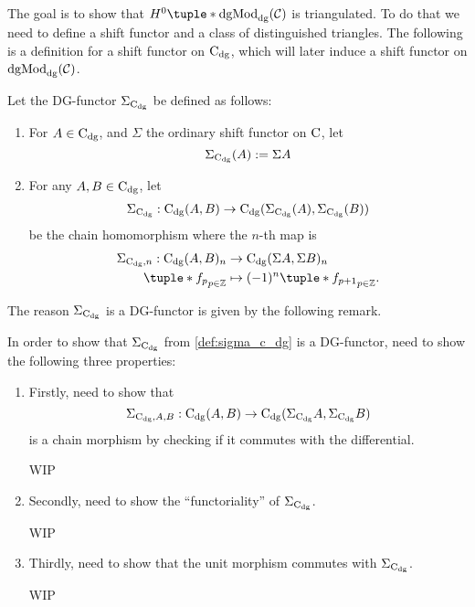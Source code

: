 The goal is to show that \( H^0\tuple*{\dgMod_{\dg}(\Cc)} \) is triangulated. To do that we need to define a shift functor and a class of distinguished triangles. The following is a definition for a shift functor on \( \operatorname{C}_{\operatorname{dg}} \), which will later induce a shift functor on \( \operatorname{dgMod}_{\operatorname{dg}}({\mathcal{C}}) \).

\begin{definition}[\( \Sigma_{\C_{\dg}} \)]
    \label{def:sigma_c_dg}
    Let the DG-functor \( \Sigma_{\C_{\dg}} \) be defined as follows:
    \begin{enumerate}
        \item {
            For \( A \in \operatorname{C}_{\operatorname{dg}} \), and \( \Sigma \) the ordinary shift functor on \( \operatorname{C} \), let
            \[
                \Sigma_{\operatorname{C}_{\operatorname{dg}}}(A) := \Sigma A
            \]
        }
        \item {
            For any \( A, B \in \operatorname{C}_{\operatorname{dg}} \), let
            \begin{align*}
                \Sigma_{\operatorname{C}_{\operatorname{dg}}}: \operatorname{C}_{\operatorname{dg}}(A, B) \to \operatorname{C}_{\operatorname{dg}}(\Sigma_{\operatorname{C}_{\operatorname{dg}}}(A), \Sigma_{\operatorname{C}_{\operatorname{dg}}}(B))
            \end{align*}
            be the chain homomorphism where the \( n \)-th map is
            \begin{align*}
                \Sigma_{\C_{\dg}, n}: \C_{\dg}(A, B)_n &\to \C_{\dg}(\Sigma A, \Sigma B)_n \\
                \tuple*{ f_p }_{p \in \Zb} &\mapsto (-1)^n \tuple*{ f_{p + 1} }_{p \in \Zb}.
            \end{align*}
        }
    \end{enumerate}
\end{definition}

The reason \( \Sigma_{\C_{\dg}} \) is a DG-functor is given by the following remark. 

\begin{remark}
    In order to show that \( \Sigma_{\C_{\dg}} \) from \autoref{def:sigma_c_dg} is a DG-functor, need to show the following three properties:
    \begin{enumerate}
        \item {
            Firstly, need to show that
            \[
                \Sigma_{\operatorname{C}_{\operatorname{dg}}, A, B}: \operatorname{C}_{\operatorname{dg}}(A, B) \to \operatorname{C}_{\operatorname{dg}}(\Sigma_{\operatorname{C}_{\operatorname{dg}}} A, \Sigma_{\operatorname{C}_{\operatorname{dg}}} B)
            \]
            is a chain morphism by checking if it commutes with the differential.

            WIP
        }
        \item {
            Secondly, need to show the ``functoriality'' of \( \Sigma_{\C_{\dg}} \).

            WIP
        }
        \item {
            Thirdly, need to show that the unit morphism commutes with \( \Sigma_{\C_{\dg}} \).

            WIP
        }
    \end{enumerate}
\end{remark}


